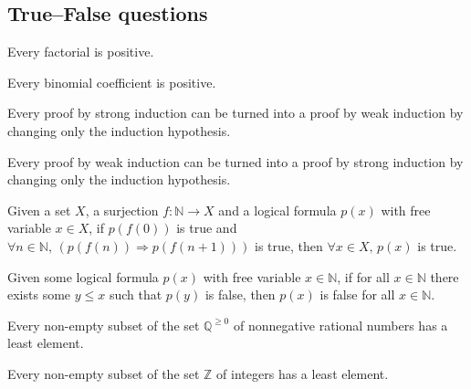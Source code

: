 \subsection*{True--False questions}


\begin{chapex} %
\label{cqInductionTFBegin}
Every factorial is positive.
\end{chapex}

\begin{chapex} %
Every binomial coefficient is positive.
\end{chapex}

\begin{chapex} %
Every proof by strong induction can be turned into a proof by weak induction by changing only the induction hypothesis.
\end{chapex}

\begin{chapex} %
Every proof by weak induction can be turned into a proof by strong induction by changing only the induction hypothesis.
\end{chapex}

\begin{chapex} %
Given a set $X$, a surjection $f : \mathbb{N} \to X$ and a logical formula $p(x)$ with free variable $x \in X$, if $p(f(0))$ is true and $\forall n \in \mathbb{N},\, (p(f(n)) \Rightarrow p(f(n+1)))$ is true, then $\forall x \in X,\, p(x)$ is true.
\end{chapex}

\begin{chapex} %
Given some logical formula $p(x)$ with free variable $x \in \mathbb{N}$, if for all $x \in \mathbb{N}$ there exists some $y \le x$ such that $p(y)$ is false, then $p(x)$ is false for all $x \in \mathbb{N}$.
\end{chapex}

\begin{chapex} %
Every non-empty subset of the set $\mathbb{Q}^{\ge 0}$ of nonnegative rational numbers has a least element. 
\end{chapex}

\begin{chapex} %
Every non-empty subset of the set $\mathbb{Z}$ of integers has a least element.
\end{chapex}


